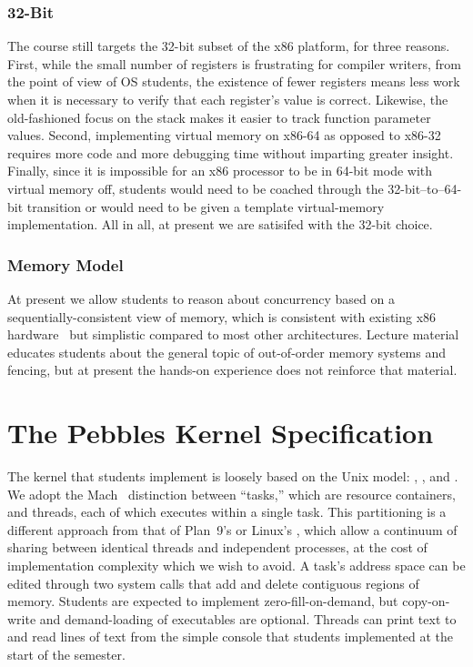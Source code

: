 \subsubsection{32-Bit}

The course still targets the 32-bit
subset of the x86 platform, for three reasons.
First, while the small number of registers is
frustrating for compiler writers,
from the point of view of OS students,
the existence of fewer registers means less work
when it is necessary to verify that each register's
value is correct.
Likewise, the old-fashioned focus on the stack
makes it easier to track function parameter values.
Second, implementing virtual memory on x86-64 as
opposed to x86-32 requires more code and more
debugging time without imparting greater insight.
Finally, since it is impossible for an x86 processor
to be in 64-bit mode with virtual memory off,
students would need to be coached through the
32-bit--to--64-bit transition or would need
to be given a template virtual-memory implementation.
All in all, at present we are satisifed with
the 32-bit choice.

\subsubsection{Memory Model}

At present we allow students
to reason about concurrency based on a
sequentially-consistent view of
memory, which is consistent with
existing x86 hardware~\cite{SewellSOZNM:x86tso-cacm10}
but simplistic compared to most other
architectures.
Lecture material educates students about the
general topic of out-of-order memory systems
and fencing,
but at present the hands-on experience does not
reinforce that material.

\section{The Pebbles Kernel Specification}
\label{sec:pebbles}

The kernel that students implement is loosely based on the
Unix model: , , and .
We adopt the Mach~\cite{DBLP:conf/usenix/AccettaBBGRTY86}
distinction between ``tasks,''
which are resource containers,
and threads,
each of which executes within a single task.
This partitioning is a different approach from that of
Plan~9's  or Linux's ,
which allow a continuum of sharing between
identical threads and independent processes,
at the cost of implementation complexity which we wish to avoid.
A task's address space can be edited through two system
calls that add and delete contiguous regions of memory.
Students are expected to implement zero-fill-on-demand,
but copy-on-write and demand-loading of executables are
optional.
Threads can print text to and read lines of text from
the simple console that students implemented at
the start of the semester.

